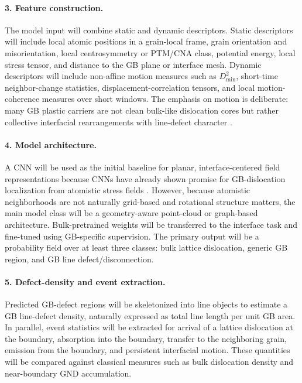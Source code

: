 \documentclass[11pt]{article}
\begin{document}
\paragraph{3. Feature construction.}
The model input will combine static and dynamic descriptors. Static descriptors will include local atomic positions in a grain-local frame, grain orientation and misorientation, local centrosymmetry or PTM/CNA class, potential energy, local stress tensor, and distance to the GB plane or interface mesh. Dynamic descriptors will include non-affine motion measures such as $D^2_{\min}$, short-time neighbor-change statistics, displacement-correlation tensors, and local motion-coherence measures over short windows. The emphasis on motion is deliberate: many GB plastic carriers are not clean bulk-like dislocation cores but rather collective interfacial rearrangements with line-defect character \cite{Sharp2018}.

\paragraph{4. Model architecture.}
A CNN will be used as the initial baseline for planar, interface-centered field representations because CNNs have already shown promise for GB-dislocation localization from atomistic stress fields \cite{Noh2024}. However, because atomistic neighborhoods are not naturally grid-based and rotational structure matters, the main model class will be a geometry-aware point-cloud or graph-based architecture. Bulk-pretrained weights will be transferred to the interface task and fine-tuned using GB-specific supervision. The primary output will be a probability field over at least three classes: bulk lattice dislocation, generic GB region, and GB line defect/disconnection.

\paragraph{5. Defect-density and event extraction.}
Predicted GB-defect regions will be skeletonized into line objects to estimate a GB line-defect density, naturally expressed as total line length per unit GB area. In parallel, event statistics will be extracted for arrival of a lattice dislocation at the boundary, absorption into the boundary, transfer to the neighboring grain, emission from the boundary, and persistent interfacial motion. These quantities will be compared against classical measures such as bulk dislocation density and near-boundary GND accumulation.
\end{document}
